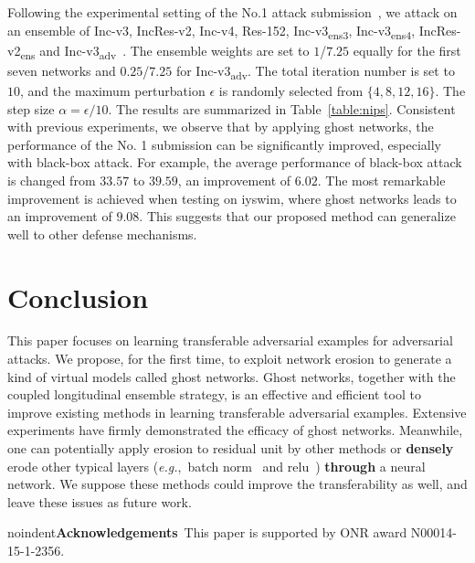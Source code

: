 \documentclass[letterpaper]{article} %
\def\eg{\emph{e.g.}}
\begin{document}
Following the experimental setting of the No.1 attack submission~\cite{dong2017boosting}, we attack on an ensemble of Inc-v3, IncRes-v2, Inc-v4, Res-152, Inc-v3\textsubscript{ens3}, Inc-v3\textsubscript{ens4}, IncRes-v2\textsubscript{ens} and Inc-v3\textsubscript{adv}~\cite{kurakin2016scale}. The ensemble weights are set to $1$/$7.25$ equally for the first seven networks and $0.25$/$7.25$ for Inc-v3\textsubscript{adv}. The total iteration number is set to $10$, and the maximum perturbation $\epsilon$ is randomly selected from $\{4, 8, 12, 16\}$. The step size $\alpha = \epsilon/10$.
The results are summarized in Table~\ref{table:nips}. Consistent with previous experiments, we observe that by applying ghost networks, the performance of the No. 1 submission can be significantly improved, especially with black-box attack.
For example, the average performance of black-box attack is changed from $33.57$ to $39.59$, an improvement of $6.02$. The most remarkable improvement is achieved when testing on iyswim, where ghost networks leads to an improvement of $9.08$.
This suggests that our proposed method can generalize well to other defense mechanisms.

\section{Conclusion}
This paper focuses on learning transferable adversarial examples for adversarial attacks. We propose, for the first time, to exploit network erosion to generate a kind of virtual models called ghost networks. Ghost networks, together with the coupled longitudinal ensemble strategy, is an effective and efficient tool to improve existing methods in learning transferable adversarial examples. Extensive experiments have firmly demonstrated the efficacy of ghost networks. Meanwhile, one can potentially apply erosion to residual unit by other methods or \textbf{densely} erode other typical layers (\eg,~batch norm~\cite{ioffe2015batch} and relu~\cite{nair2010rectified}) \textbf{through} a neural network. We suppose these methods could improve the transferability as well, and leave these issues as future work.

noindent\textbf{Acknowledgements}~This paper is supported by ONR award N00014-15-1-2356.%
\end{document}
